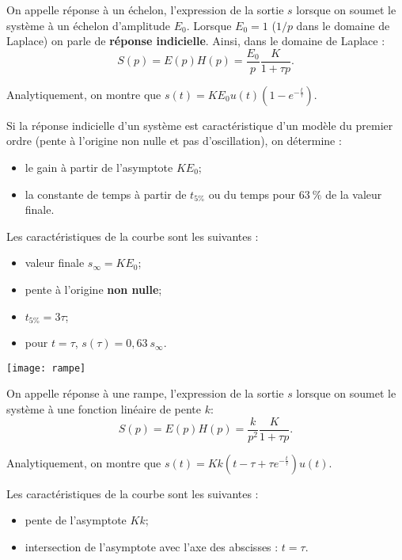 \begin{resultat}

On appelle réponse à un échelon, l'expression de la sortie $s$ lorsque on soumet le système à un échelon d'amplitude $E_0$. Lorsque $E_0=1$ ($1/p$ dans le domaine de Laplace) on parle de \textbf{réponse indicielle}.
Ainsi, dans le domaine de Laplace :
$$
S(p)=E(p)H(p) = \dfrac{E_0}{p} \dfrac{K}{1+\tau p}.
$$ 

Analytiquement, on montre que $s(t)=K E_0 u(t) \left(1-e^{-\frac{t}{\tau}}\right)$. 

Si la réponse indicielle d'un système est caractéristique d'un modèle du premier ordre (pente à l'origine non nulle et pas d'oscillation), on détermine :
\begin{itemize}
\item le gain à partir de l'asymptote $K E_0$;
\item la constante de temps à partir de $t_{5\%}$ ou du temps pour $63~\%$ de la valeur finale.%
\end{itemize}
Les caractéristiques de la courbe sont les suivantes : 
\begin{itemize}
\item valeur finale $s_{\infty}=K E_0$;
\item pente à l'origine \textbf{non nulle};
\item $t_{5\%}=3\tau$;
\item pour $t=\tau$, $s(\tau)=0,63~ s_{\infty}$.
\end{itemize}
\end{resultat}




\begin{marginfigure}
\texttt{[image: rampe]}
\end{marginfigure}
\begin{resultat}

On appelle réponse à une rampe, l'expression de la sortie $s$ lorsque on soumet le système à une fonction linéaire de pente $k$: 
$$
S(p)=E(p)H(p) = \dfrac{k}{p^2} \dfrac{K}{1+\tau p}.
$$ 


Analytiquement, on montre que $s(t)=Kk \left(t-\tau+\tau e^{-\frac{t}{\tau}}\right)u(t)$. 

Les caractéristiques de la courbe sont les suivantes : 
\begin{itemize}
\item pente de l'asymptote $K k$;
\item intersection de l'asymptote avec l'axe des abscisses : $t=\tau$.
\end{itemize}
\end{resultat}
\newpage


